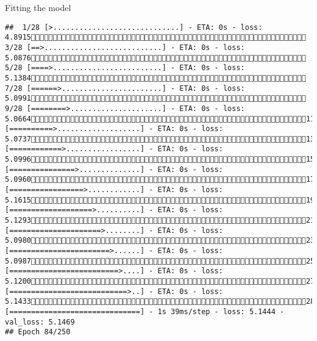 \documentclass[
  ignorenonframetext,
]{beamer}
\begin{document}
\begin{frame}[fragile]{Fitting the model}
\begin{verbatim}
##  1/28 [>.............................] - ETA: 0s - loss: 4.8915 3/28 [==>...........................] - ETA: 0s - loss: 5.0876 5/28 [====>.........................] - ETA: 0s - loss: 5.1384 7/28 [======>.......................] - ETA: 0s - loss: 5.0991 9/28 [========>.....................] - ETA: 0s - loss: 5.066411/28 [==========>...................] - ETA: 0s - loss: 5.073713/28 [============>.................] - ETA: 0s - loss: 5.099615/28 [===============>..............] - ETA: 0s - loss: 5.096017/28 [=================>............] - ETA: 0s - loss: 5.161519/28 [===================>..........] - ETA: 0s - loss: 5.129321/28 [=====================>........] - ETA: 0s - loss: 5.098023/28 [=======================>......] - ETA: 0s - loss: 5.098725/28 [=========================>....] - ETA: 0s - loss: 5.120027/28 [===========================>..] - ETA: 0s - loss: 5.143328/28 [==============================] - 1s 39ms/step - loss: 5.1444 - val_loss: 5.1469
## Epoch 84/250

\end{verbatim}
\end{frame}
\end{document}
